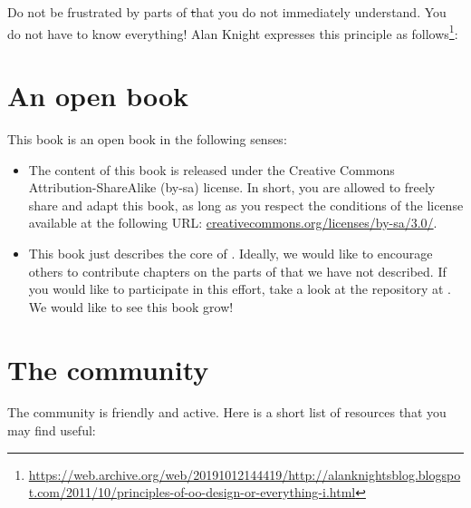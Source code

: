 \documentclass[a4paper,10pt,twoside]{book}
\begin{document}
Do not be frustrated by parts of \st that you do not immediately understand.
You do not have to know everything!
Alan Knight expresses this principle as follows\footnote{\url{https://web.archive.org/web/20191012144419/http://alanknightsblog.blogspot.com/2011/10/principles-of-oo-design-or-everything-i.html}}:

\section*{An open book}

This book is an open book in the following senses:

\begin{itemize}

\item	The content of this book is released under the Creative Commons Attribution-ShareAlike (by-sa) license.
		In short, you are allowed to freely share and adapt this book, as long as you respect the conditions of the license available at the following URL:
		\url{creativecommons.org/licenses/by-sa/3.0/}.

\item	This book just describes the core of \sq.
		Ideally, we would like to encourage others to contribute chapters on the parts of \sq that we have not described.
		If you would like to participate in this effort, take a look at the repository at \sbeRepoUrl.
		We would like to see this book grow!
\end{itemize}

\section*{The \sq community}

The \sq community is friendly and active.
Here is a short list of resources that you may find useful:
\end{document}
